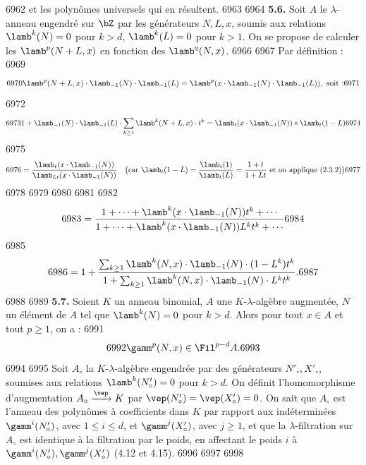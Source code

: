   6962	et les polyn\^omes universels qui en r\'esultent.
  6963	
  6964		\noindent\textbf{5.6.} Soit $A$ le $\lambda$-anneau engendr\'e sur $\bZ$ par les g\'en\'erateurs $N, L, x$, soumis aux relations $\lamb^k(N) = 0$ pour $k > d$, $\lamb^k(L) = 0$ pour $k > 1$. On se propose de calculer les $\lamb^p(N+L,x)$ en fonction des $\lamb^q(N,x)$.
  6966	
  6967		Par d\'efinition :
  6969	\[
  6970	\lamb^p(N+L,x) \cdot \lamb_{-1}(N) \cdot \lamb_{-1}(L) = \lamb^p(x \cdot \lamb_{-1}(N) \cdot \lamb_{-1}(L)), \text{ soit :}
  6971	\]
  6972	\[
  6973	1 + \lamb_{-1}(N) \cdot \lamb_{-1}(L) \cdot \sum_{k \geq 1} \lamb^k(N+L,x) \cdot t^k = \lamb_t(x \cdot \lamb_{-1}(N)) \circ \lamb_t(1-L)
  6974	\]
  6975	\[
  6976	= \frac{\lamb_t(x \cdot \lamb_{-1}(N))}{\lamb_{Lt}(x \cdot \lamb_{-1}(N))} \quad \bigl(\text{car } \lamb_t(1-L) = \frac{\lamb_t(1)}{\lamb_t(L)} = \frac{1+t}{1+Lt} \text{ et on applique (2.3.2)}\bigr)
  6977	\]
  6978	
  6979	%
  6980	%
  6981	%
  6982	\[
  6983	= \frac{1 + \cdots + \lamb^k(x \cdot \lamb_{-1}(N)) t^k + \cdots}{1 + \cdots + \lamb^k(x \cdot \lamb_{-1}(N)) L^k t^k + \cdots}
  6984	\]
  6985	\[
  6986	= 1 + \frac{\sum_{k \geq 1} \lamb^k(N,x) \cdot \lamb_{-1}(N) \cdot (1-L^k) t^k}{1 + \sum_{k \geq 1} \lamb^k(N,x) \cdot \lamb_{-1}(N) \cdot L^k t^k}.
  6987	\]
  6988	
  6989		\noindent\textbf{5.7.} Soient $K$ un anneau binomial, $A$ une $K$-$\lambda$-alg\`ebre augment\'ee, $N$ un \'el\'ement de $A$ tel que $\lamb^k(N) = 0$ pour $k > d$. Alors pour tout $x \in A$ et tout $p \geq 1$, on a :
  6991	\begin{equation}
  6992	\gamm^p(N,x) \in \Fil^{p-d} A.
  6993	\end{equation}
  6994	
  6995	Soit $A_\circ$ la $K$-$\lambda$-alg\`ebre engendr\'ee par des g\'en\'erateurs $N'_\circ, X'_\circ$, soumises aux relations $\lamb^k(N'_\circ) = 0$ pour $k > d$. On d\'efinit l'homomorphisme d'augmentation $A_\circ \xrightarrow{\vep} K$ par $\vep(N'_\circ) = \vep(X'_\circ) = 0$. On sait que $A_\circ$ est l'anneau des polyn\^omes \`a coefficients dans $K$ par rapport aux ind\'etermin\'ees $\gamm^i(N'_\circ)$, avec $1 \leq i \leq d$, et $\gamm^j(X'_\circ)$, avec $j \geq 1$, et que la $\lambda$-filtration sur $A_\circ$ est identique \`a la filtration par le poids, en affectant le poids $i$ \`a $\gamm^i(N'_\circ), \gamm^j(X'_\circ)$ (4.12 et 4.15).
  6996	
  6997	%
  6998	%
